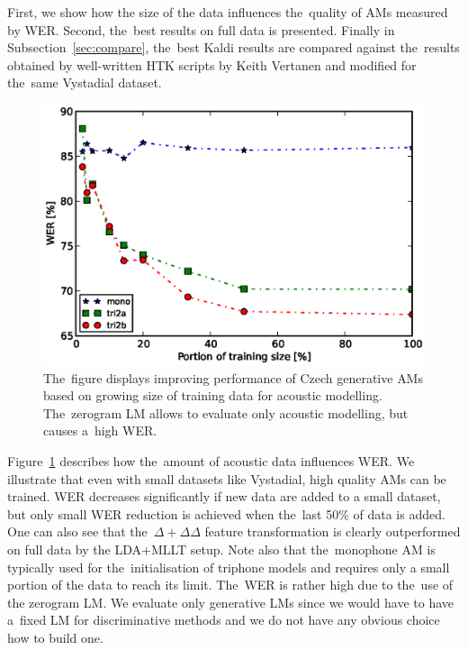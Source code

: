 First, we show how the size of the data influences the~quality of \acp{AM} measured by \ac{WER}.
Second,  the~best results on full data is presented.
Finally in Subsection~\ref{sec:compare}, the~best Kaldi results are compared against the~results obtained by well-written \ac{HTK} scripts by Keith Vertanen and modified for the~same Vystadial dataset\cite{korvas_2014}.

\begin{figure}[!htp]
    \begin{center}
    \includegraphics[scale=0.7]{images/partial-zerogram.ps}
    \caption{The~figure displays improving performance of Czech generative \acp{AM} based on growing size of training data for acoustic modelling. The~zerogram \acs{LM} allows to evaluate only acoustic modelling, but causes a~high \acs{WER}. }
    \label{fig:partials} 
    \end{center}
\end{figure}

Figure~\ref{fig:partials} describes how the~amount of acoustic data influences \ac{WER}.
We illustrate that even with small datasets like Vystadial, high quality \acp{AM} can be trained.
WER decreases significantly if new data are added to a small dataset, but only small \ac{WER} reduction is achieved when the~last 50\% of data is added.
One can also see that the~$\Delta+\Delta\Delta$ feature transformation is clearly outperformed on full data by the \ac{LDA}+\ac{MLLT} setup.
Note also that the~monophone \ac{AM} is typically used for the~initialisation of triphone models and requires only a small portion of the data to reach its limit.
The~WER is rather high due to the~use of the zerogram \ac{LM}.
We evaluate only generative \acp{LM} since we would have to have a~fixed LM for discriminative methods and we do not have any obvious choice how to build one.

